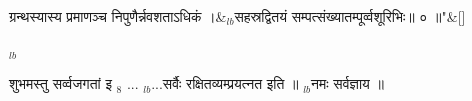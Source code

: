\documentclass[article,12pt,a4paper]{memoir}%
\newcounter{parCount}
\begin{document}
	    
	    \stanza[\smallbreak]
	  ग्रन्थस्यास्य प्रमाणञ्च निपुणैर्न्नवशताऽधिकं ।&{\tiny $_{lb}$}सहस्रद्वितयं सम्पत्संख्यातम्पूर्व्वशूरिभिः॥ ० ॥{\normalfontlatin\large\qquad{}"}\&[\smallbreak]
	  
	  
	  
	  \endgroup
	{\tiny $_{lb}$}

	  
	  \pstart \leavevmode%
	शुभमस्तु सर्व्वजगतां इ {\tiny $_{8}$} ... {\tiny $_{lb}$}...सर्वैः रक्षितव्यम्प्रयत्नत इति ॥ {\tiny $_{lb}$}नमः सर्वज्ञाय ॥ 
	{}
	\pend%
      
	    
	    \endnumbering%
	    
     \backmatter 
\end{document}
